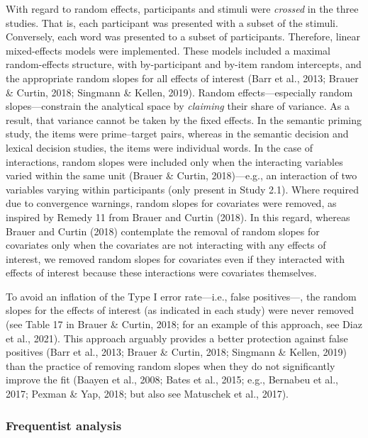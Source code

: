 \documentclass[
  12pt,
  man,floatsintext]{apa7}
\begin{document}
With regard to random effects, participants and stimuli were \emph{crossed} in the three studies. That is, each participant was presented with a subset of the stimuli. Conversely, each word was presented to a subset of participants. Therefore, linear mixed-effects models were implemented. These models included a maximal random-effects structure, with by-participant and by-item random intercepts, and the appropriate random slopes for all effects of interest (Barr et al., 2013; Brauer \& Curtin, 2018; Singmann \& Kellen, 2019). Random effects---especially random slopes---constrain the analytical space by \emph{claiming} their share of variance. As a result, that variance cannot be taken by the fixed effects. In the semantic priming study, the items were prime--target pairs, whereas in the semantic decision and lexical decision studies, the items were individual words. In the case of interactions, random slopes were included only when the interacting variables varied within the same unit (Brauer \& Curtin, 2018)---e.g., an interaction of two variables varying within participants (only present in Study 2.1). Where required due to convergence warnings, random slopes for covariates were removed, as inspired by Remedy 11 from Brauer and Curtin (2018). In this regard, whereas Brauer and Curtin (2018) contemplate the removal of random slopes for covariates only when the covariates are not interacting with any effects of interest, we removed random slopes for covariates even if they interacted with effects of interest because these interactions were covariates themselves.

To avoid an inflation of the Type I error rate---i.e., false positives---, the random slopes for the effects of interest (as indicated in each study) were never removed (see Table 17 in Brauer \& Curtin, 2018; for an example of this approach, see Diaz et al., 2021). This approach arguably provides a better protection against false positives (Barr et al., 2013; Brauer \& Curtin, 2018; Singmann \& Kellen, 2019) than the practice of removing random slopes when they do not significantly improve the fit (Baayen et al., 2008; Bates et al., 2015; e.g., Bernabeu et al., 2017; Pexman \& Yap, 2018; but also see Matuschek et al., 2017).

\hypertarget{frequentist-analysis}{%
\subsubsection{Frequentist analysis}\label{frequentist-analysis}}
\end{document}
